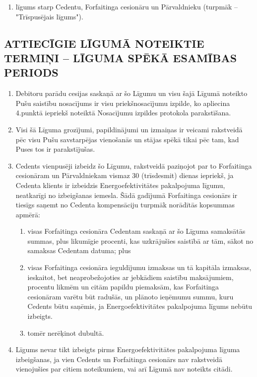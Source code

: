 \documentclass[a4paper]{article}
\begin{document}
\begin{multicols}{2}
\begin{enumerate}
\begin{enumerate}
    \item{līgums starp Cedentu, Forfaitinga cesionāru un
Pārvaldnieku (turpmāk – "Trīspusējais līgums").}
    \end{enumerate}
  \end{enumerate}

  \subsection{ATTIECĪGIE LĪGUMĀ NOTEIKTIE TERMIŅI – LĪGUMA
SPĒKĀ ESAMĪBAS PERIODS}

  \begin{enumerate}

  \item{Debitoru parādu cesijas saskaņā ar šo Līgumu un visu šajā Līgumā
noteikto Pušu saistību nosacījums ir visu priekšnosacījumu izpilde, ko
apliecina 4.punktā iepriekš noteiktā Nosacījumu izpildes protokola
parakstīšana.}

  \item{Visi šā Līguma grozījumi, papildinājumi un izmaiņas ir veicami
rakstveidā pēc visu Pušu savstarpējas vienošanās un stājas spēkā tikai
pēc tam, kad Puses tos ir parakstījušas.}

  \item{Cedents vienpusēji izbeidz šo Līgumu, rakstveidā paziņojot par to
Forfaitinga cesionāram un Pārvaldniekam vismaz 30 (trīsdesmit) dienas
iepriekš, ja Cedenta klients ir izbeidzis Energoefektivitātes pakalpojuma
līgumu, neatkarīgi no izbeigšanas iemesla. Šādā gadījumā Forfaitinga
cesionārs ir tiesīgs saņemt no Cedenta kompensāciju turpmāk
norādītās kopsummas apmērā: }

    \begin{enumerate}
    \item{visas Forfaitinga cesionāra Cedentam saskaņā ar šo Līguma
samaksātās summas, plus likumīgie procenti, kas uzkrājušies saistībā ar
tām, sākot no samaksas Cedentam datuma; plus}
    \item{visas Forfaitinga cesionāra ieguldījumu izmaksas un tā
kapitāla izmaksas, ieskaitot, bet neaprobežojoties ar jebkādiem saistību
maksājumiem, procentu likmēm un citām papildu piemaksām, kas
Forfaitinga cesionāram varētu būt radušās, un plānoto ieņēmumu
summu, kuru Cedents būtu saņēmis, ja Energoefektivitātes
pakalpojuma līgums nebūtu izbeigts.}
    \item{tomēr nerēķinot dubultā.}
    \end{enumerate}

  \item{Līgums nevar tikt izbeigts pirms Energoefektivitātes pakalpojuma
līguma izbeigšanas, ja vien Cedents un Forfaitinga cesionārs nav
rakstveidā vienojušies par citiem noteikumiem, vai arī Līgumā nav noteikts citādi.}


\end{enumerate}
\end{multicols}
\end{document}
